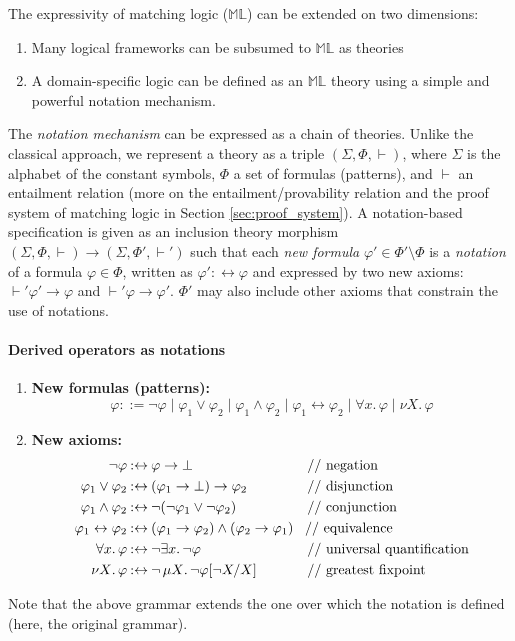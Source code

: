 \documentclass{article}
\theoremstyle{plain}
\theoremstyle{definition}
\newcommand{\ld}{\mathord{.\,}}
\newcommand{\ML}{$\mathbb{ML}$\xspace}
\newcommand{\eqbynot}{\mathbin{{:}{\leftrightarrow}}}
\newcommand{\lequiv}{\leftrightarrow}
\newcommand{\limplies}{\rightarrow}
\begin{document}
The expressivity of matching logic (\ML) can be extended on two dimensions:
\begin{enumerate}
\item Many logical frameworks can be subsumed to \ML as theories~\cite{CR19a}
\item   A domain-specific logic can be defined as an \ML theory using a simple and powerful notation mechanism.
\end{enumerate}
The \emph{notation mechanism} can be expressed as a chain of theories. Unlike the classical approach, we represent a theory as a triple $(\Sigma, \Phi, \vdash)$, where $\Sigma$ is the alphabet of the constant symbols, $\Phi$ a set of formulas (patterns), and $\vdash$ an entailment relation (more on the entailment/provability relation and the proof system of matching logic in Section \ref{sec:proof_system}). A notation-based specification is given as an inclusion theory morphism $(\Sigma, \Phi, \vdash) \allowbreak \to (\Sigma, \Phi', \vdash')$ such that each \emph{new formula} $\varphi'\in \Phi'\setminus \Phi$ is a \emph{notation} of a formula $\varphi\in\Phi$, written as $\varphi' \eqbynot \varphi$ and expressed by two new axioms: $\vdash' \varphi' \rightarrow \varphi$ and $\vdash' \varphi \rightarrow \varphi'$. $\Phi'$ may also include other axioms that constrain the use of notations.

\paragraph{Derived operators as notations}
\begin{enumerate}
\item \textbf{New formulas (patterns): }
\[
\varphi ::= \neg\varphi \mid \varphi_1 \lor \varphi_2 \mid \varphi_1 \land \varphi_2 \mid \varphi_1 \lequiv \varphi_2 \mid \forall x \ld \varphi \mid \nu X \ld \varphi
\]
\item \textbf{New axioms:}
\begin{align*}
\neg \varphi & \eqbynot \varphi \limplies \bot
&& \textrm{// negation}\\
\varphi_1 \lor \varphi_2 & \eqbynot (\varphi_1 \limplies \bot) \limplies \varphi_2 
&& \textrm{// disjunction}\\
\varphi_1 \land \varphi_2 & \eqbynot \neg(\neg \varphi_1 \lor \neg\varphi_2)
&& \textrm{// conjunction}\\
\varphi_1 \lequiv \varphi_2 & \eqbynot (\varphi_1 \limplies \varphi_2) \land (\varphi_2 \limplies \varphi_1)  
&& \textrm{\!// equivalence}\\
\forall x \ld \varphi & \eqbynot \neg \exists x \ld \neg \varphi 
&& \textrm{// universal quantification}\\
\nu X \ld \varphi &\eqbynot \neg\, \mu X \ld \neg\varphi [\neg X/ X]
&& \textrm{// greatest fixpoint}
\end{align*}
\end{enumerate}
Note that the above grammar extends the one over which the notation is defined (here, the original grammar).
\end{document}

